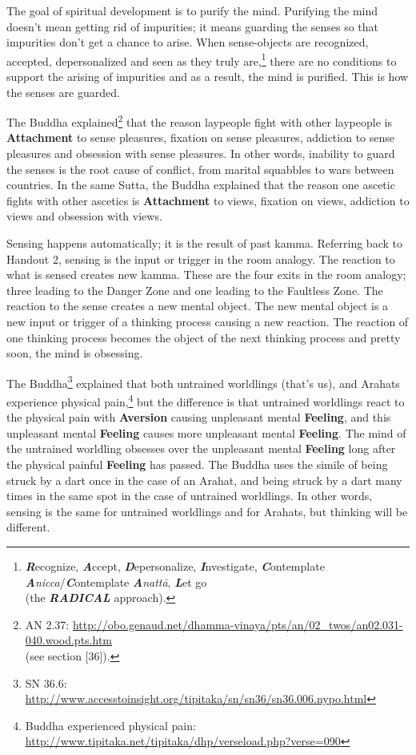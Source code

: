 The goal of spiritual development is to purify the mind. Purifying the mind doesn’t mean getting rid of impurities; it means guarding the senses so that impurities don’t get a chance to arise. When sense-objects are recognized, accepted, depersonalized and seen as they truly are,\footnote{\textit{\textbf{R}}ecognize, \textbf{\textit{A}}ccept, \textit{\textbf{D}}epersonalize, \textbf{\textit{I}}nvestigate, \textit{\textbf{C}}ontemplate \textbf{\textit{A}}\textit{nicca}/\textit{\textbf{C}}ontemplate \textbf{\textit{A}}\textit{nattā}, \textbf{\textit{L}}et go \\(the \textit{\textbf{RADICAL}} approach).} there are no conditions to support the arising of impurities and as a result, the mind is purified. This is how the senses are guarded.

The Buddha explained\footnote{AN 2.37: \url{http://obo.genaud.net/dhamma-vinaya/pts/an/02_twos/an02.031-040.wood.pts.htm}\\(see section [36]).} that the reason laypeople fight with other laypeople is \textbf{Attachment} to sense pleasures, fixation on sense pleasures, addiction to sense pleasures and obsession with sense pleasures. In other words, inability to guard the senses is the root cause of conflict, from marital squabbles to wars between countries. In the same Sutta, the Buddha explained that the reason one ascetic fights with other ascetics is \textbf{Attachment} to views, fixation on views, addiction to views and obsession with views.

Sensing happens automatically; it is the result of past kamma. Referring back to Handout 2, sensing is the input or trigger in the room analogy. The reaction to what is sensed creates new kamma. These are the four exits in the room analogy; three leading to the Danger Zone and one leading to the Faultless Zone. The reaction to the sense creates a new mental object. The new mental object is a new input or trigger of a thinking process causing a new reaction. The reaction of one thinking process becomes the object of the next thinking process and pretty soon, the mind is obsessing.

The Buddha\footnote{SN 36.6: \url{http://www.accesstoinsight.org/tipitaka/sn/sn36/sn36.006.nypo.html}} explained that both untrained worldlings (that’s us), and Arahats experience physical pain,\footnote{Buddha experienced physical pain: \url{http://www.tipitaka.net/tipitaka/dhp/verseload.php?verse=090}} but the difference is that untrained worldlings react to the physical pain with \textbf{Aversion} causing unpleasant mental \textbf{Feeling}, and this unpleasant mental \textbf{Feeling} causes more unpleasant mental \textbf{Feeling}. The mind of the untrained worldling obsesses over the unpleasant mental \textbf{Feeling} long after the physical painful \textbf{Feeling} has passed. The Buddha uses the simile of being struck by a dart once in the case of an Arahat, and being struck by a dart many times in the same spot in the case of untrained worldlings. In other words, sensing is the same for untrained worldlings and for Arahats, but thinking will be different.

